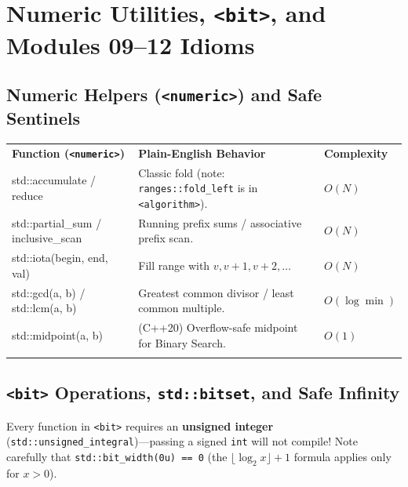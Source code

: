 \documentclass[11pt,a4paper]{article}
\begin{document}
\section{Numeric Utilities, \texttt{<bit>}, and Modules 09--12 Idioms}

\subsection{Numeric Helpers (\texttt{<numeric>}) and Safe Sentinels}

\begingroup\small{}
\begin{tabularx}{\textwidth}{>{\raggedright\arraybackslash\ttfamily}p{4.0cm} >{\raggedright\arraybackslash}X >{\centering\arraybackslash}p{2.0cm}}
\arrayrulecolor{primaryblue}\toprule[1.1pt]
\rowcolor{primaryblue!10}
\textcolor{primaryblue}{\normalfont\bfseries Function (\texttt{<numeric>})} & \textcolor{primaryblue}{\textbf{Plain-English Behavior}} & \textcolor{primaryblue}{\textbf{Complexity}} \\
\arrayrulecolor{codeframe}\midrule[0.6pt]
std::accumulate / reduce & Classic fold (note: \texttt{ranges::fold\_left} is in \texttt{<algorithm>}). & $O(N)$ \\
std::partial\_sum / inclusive\_scan & Running prefix sums / associative prefix scan. & $O(N)$ \\
std::iota(begin, end, val) & Fill range with $v, v+1, v+2, \dots$ & $O(N)$ \\
std::gcd(a, b) / std::lcm(a, b) & Greatest common divisor / least common multiple. & $O(\log \min)$ \\
std::midpoint(a, b) & (C++20) Overflow-safe midpoint for Binary Search. & $O(1)$ \\
\arrayrulecolor{primaryblue}\bottomrule[1.1pt]
\end{tabularx}\endgroup

\subsection{\texttt{<bit>} Operations, \texttt{std::bitset}, and Safe Infinity}

Every function in \texttt{<bit>} requires an \textbf{unsigned integer} (\texttt{std::unsigned\_integral})---passing a signed \texttt{int} will not compile! Note carefully that \texttt{std::bit\_width(0u) == 0} (the $\lfloor \log_2 x \rfloor + 1$ formula applies only for $x > 0$).
\end{document}
